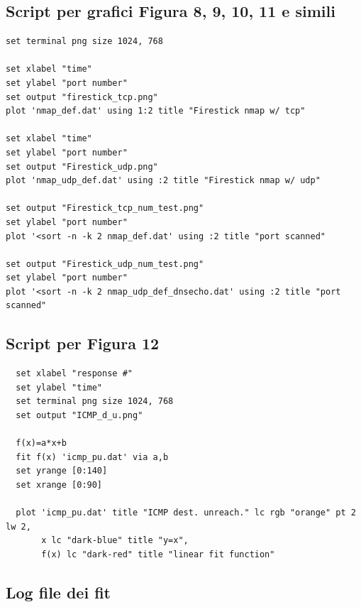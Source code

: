 \documentclass{article}
\begin{document}
\subsection{Script per grafici Figura 8, 9, 10, 11 e simili}
\begin{verbatim}
set terminal png size 1024, 768

set xlabel "time"
set ylabel "port number"
set output "firestick_tcp.png"
plot 'nmap_def.dat' using 1:2 title "Firestick nmap w/ tcp" 

set xlabel "time"
set ylabel "port number"
set output "Firestick_udp.png"
plot 'nmap_udp_def.dat' using :2 title "Firestick nmap w/ udp" 

set output "Firestick_tcp_num_test.png"
set ylabel "port number"
plot '<sort -n -k 2 nmap_def.dat' using :2 title "port scanned"

set output "Firestick_udp_num_test.png"
set ylabel "port number"
plot '<sort -n -k 2 nmap_udp_def_dnsecho.dat' using :2 title "port scanned"
\end{verbatim}

\subsection{Script per Figura 12}
\begin{verbatim}
  set xlabel "response #"
  set ylabel "time"
  set terminal png size 1024, 768
  set output "ICMP_d_u.png"
  
  f(x)=a*x+b
  fit f(x) 'icmp_pu.dat' via a,b
  set yrange [0:140]
  set xrange [0:90]

  plot 'icmp_pu.dat' title "ICMP dest. unreach." lc rgb "orange" pt 2 lw 2,
       x lc "dark-blue" title "y=x",
       f(x) lc "dark-red" title "linear fit function"
\end{verbatim}
\pagebreak
\subsection{Log file dei fit}
\end{document}
